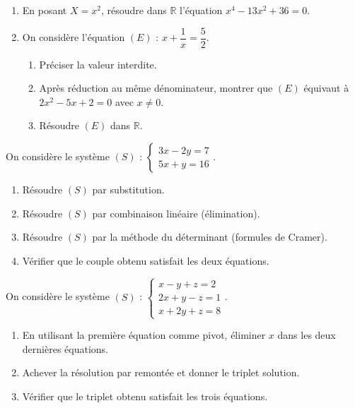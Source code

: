 \documentclass[11pt]{article}
\begin{document}
\begin{exercice}
\begin{enumerate}
\item En posant $X=x^2$, résoudre dans $\mathbb{R}$ l'équation $x^4-13x^2+36=0$.
\item On considère l'équation $(E)$ : $x+\dfrac{1}{x}=\dfrac{5}{2}$.
\begin{enumerate}
\item Préciser la valeur interdite.
\item Après réduction au même dénominateur, montrer que $(E)$ équivaut à $2x^2-5x+2=0$ avec $x\neq 0$.
\item Résoudre $(E)$ dans $\mathbb{R}$.
\end{enumerate}
\end{enumerate}
\end{exercice}

\begin{exercice}
On considère le système $(S)$ : $\begin{cases} 3x-2y=7\\ 5x+y=16 \end{cases}$.
\begin{enumerate}
\item Résoudre $(S)$ par substitution.
\item Résoudre $(S)$ par combinaison linéaire (élimination).
\item Résoudre $(S)$ par la méthode du déterminant (formules de Cramer).
\item Vérifier que le couple obtenu satisfait les deux équations.
\end{enumerate}
\end{exercice}

\begin{exercice}
On considère le système $(S)$ : $\begin{cases} x-y+z=2\\ 2x+y-z=1\\ x+2y+z=8 \end{cases}$.
\begin{enumerate}
\item En utilisant la première équation comme pivot, éliminer $x$ dans les deux dernières équations.
\item Achever la résolution par remontée et donner le triplet solution.
\item Vérifier que le triplet obtenu satisfait les trois équations.
\end{enumerate}
\end{exercice}
\end{document}
